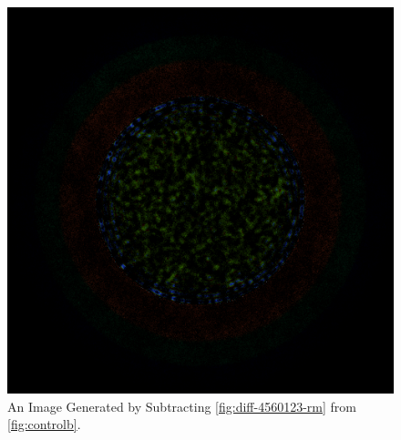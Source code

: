 \begin{figure}[H]
\centering
\includegraphics[width=0.6\linewidth]{figures/shuffle/diff-4560123}
\caption{An Image Generated by Subtracting \ref{fig:diff-4560123-rm} from \ref{fig:controlb}.}
\label{fig:diff-4560123}
\end{figure}